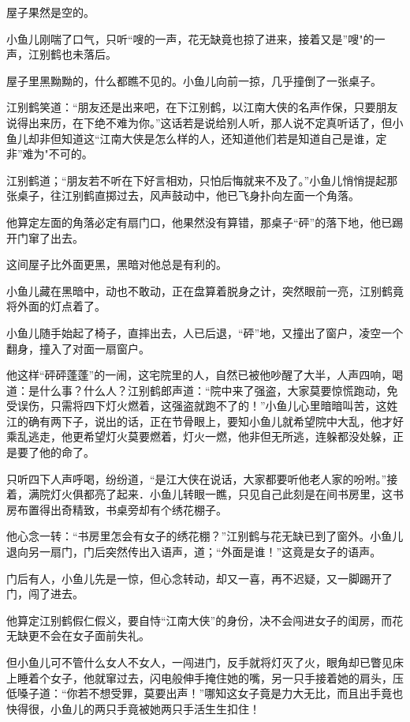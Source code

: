 \documentclass[12pt,oneside]{book}
\begin{document}
屋子果然是空的。

小鱼儿刚喘了口气，只听``嗖的一声，花无缺竟也掠了进来，接着又是''嗖"的一声，江别鹤也未落后。

屋子里黑黝黝的，什么都瞧不见的。小鱼儿向前一掠，几乎撞倒了一张桌子。

江别鹤笑道：``朋友还是出来吧，在下江别鹤，以江南大侠的名声作保，只要朋友说得出来历，在下绝不难为你。''这话若是说给别人听，那人说不定真听话了，但小鱼儿却非但知道这``江南大侠是怎么样的人，还知道他们若是知道自己是谁，定非''难为"不可的。

江别鹤道；``朋友若不听在下好言相劝，只怕后悔就来不及了。''小鱼儿悄悄提起那张桌子，往江别鹤直掷过去，风声鼓动中，他已飞身扑向左面一个角落。

他算定左面的角落必定有扇门口，他果然没有算错，那桌子``砰''的落下地，他已踢开门窜了出去。

这间屋子比外面更黑，黑暗对他总是有利的。

小鱼儿藏在黑暗中，动也不敢动，正在盘算着脱身之计，突然眼前一亮，江别鹤竟将外面的灯点着了。

小鱼儿随手始起了椅子，直摔出去，人已后退，``砰''地，又撞出了窗户，凌空一个翻身，撞入了对面一扇窗户。

他这样``砰砰蓬蓬''的一闹，这宅院里的人，自然已被他吵醒了大半，人声四响，喝道：是什么事？什么人？江别鹤郎声道：``院中来了强盗，大家莫要惊慌跑动，免受误伤，只需将四下灯火燃着，这强盗就跑不了的！''小鱼儿心里暗暗叫苦，这姓江的确有两下子，说出的话，正在节骨眼上，要知小鱼儿就希望院中大乱，他才好乘乱逃走，他更希望灯火莫要燃着，灯火一燃，他非但无所逃，连躲都没处躲，正是要了他的命了。

只听四下人声呼喝，纷纷道，``是江大侠在说话，大家都要听他老人家的吩咐。''接着，满院灯火俱都亮了起来．小鱼儿转眼一瞧，只见自己此刻是在间书房里，这书房布置得出奇精致，书桌旁却有个绣花棚子。

他心念一转：``书房里怎会有女子的绣花棚？''江别鹤与花无缺已到了窗外。小鱼儿退向另一扇门，门后突然传出入语声，道；``外面是谁！''这竟是女子的语声。

门后有人，小鱼儿先是一惊，但心念转动，却又一喜，再不迟疑，又一脚踢开了门，闯了进去。

他算定江别鹤假仁假义，要自恃``江南大侠''的身份，决不会闯进女子的闺房，而花无缺更不会在女子面前失礼。

但小鱼儿可不管什么女人不女人，一闯进门，反手就将灯灭了火，眼角却已瞥见床上睡着个女子，他就窜过去，闪电般伸手掩住她的嘴，另一只手接着她的肩头，压低嗓子道：``你若不想受罪，莫要出声！''哪知这女子竟是力大无比，而且出手竟也快得很，小鱼儿的两只手竟被她两只手活生生扣住！
\end{document}
